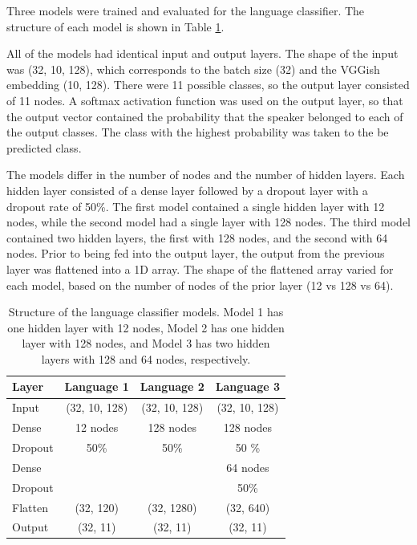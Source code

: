 Three models were trained and evaluated for the language classifier. The structure of each model is shown in Table \ref{tab:LangModels}. 

All of the models had identical input and output layers. The shape of the input was (32, 10, 128), which corresponds to the batch size (32) and the VGGish embedding (10, 128).  There were 11 possible classes, so the output layer consisted of 11 nodes. A softmax activation function was used on the output layer, so that the output vector contained the probability that the speaker belonged to each of the output classes. The class with the highest probability was taken to the be predicted class.

The models differ in the number of nodes and the number of hidden layers. Each hidden layer consisted of a dense layer followed by a dropout layer with a dropout rate of 50\%. The first model contained a single hidden layer with 12 nodes, while the second model had a single layer with 128 nodes. The third model contained two hidden layers, the first with 128 nodes, and the second with 64 nodes. Prior to being fed into the output layer, the output from the previous layer was flattened into a 1D array. The shape of the flattened array varied for each model, based on the number of nodes of the prior layer (12 vs 128 vs 64).

\begin{table}[!h]
\begin{center}
\caption{Structure of the language classifier models. Model 1 has one hidden layer with 12 nodes, Model 2 has one hidden layer with 128 nodes, and Model 3 has two hidden layers with 128 and 64 nodes, respectively.}
\begin{tabular}{l | c |c  | c |}

Layer  & Language 1 & Language 2 & Language 3\\
\hline

Input 	& (32, 10, 128)& (32, 10, 128) & (32, 10, 128) \\ \hline

Dense	& 12 nodes 	& 128 nodes 	& 128 nodes \\
Dropout	& 50\%		& 50\%		& 50 \% \\ \hline

Dense	&			&			& 64 nodes \\
Dropout	&			& 			& 50\% \\ \hline

Flatten 	& (32, 120)	& (32, 1280)	& (32, 640) \\ \hline
Output 	& (32, 11)		& (32, 11)		& (32, 11)\\
\hline
\end{tabular}

\label{tab:LangModels}
\end{center}
\end{table}

